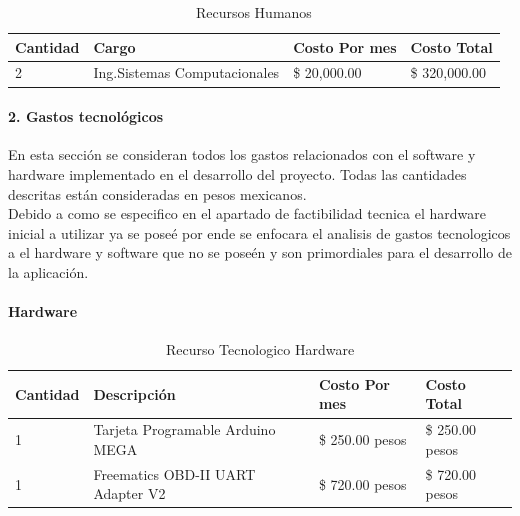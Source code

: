 \begin{table}[h!]
\begin{tabular}{|p{2cm}|p{4cm}|p{4cm}|p{4cm}|}
\hline
\textbf{Cantidad}& \textbf{Cargo}&\textbf{Costo Por mes}& \textbf{Costo Total}\\
\hline
\hline
2 & Ing.Sistemas Computacionales & \$ 20,000.00 & \$ 320,000.00 \\
\hline
\end{tabular}
\caption{Recursos Humanos}
\label{disenoEstructura:RH}
\end{table}


\paragraph{2. Gastos tecnológicos} 

En esta sección se consideran todos los gastos relacionados con el software y hardware implementado en el desarrollo del proyecto. Todas las cantidades descritas están consideradas en pesos mexicanos.\\

Debido a como se especifico en el apartado de factibilidad tecnica el hardware inicial a utilizar ya se poseé por ende se enfocara el analisis de gastos tecnologicos a el hardware y software que no se poseén y son primordiales para el desarrollo de la aplicación.

\paragraph{Hardware} 

\begin{table}[h!]
\begin{tabular}{|p{2cm}|p{4cm}|p{4cm}|p{4cm}|}
\hline
\textbf{Cantidad}& \textbf{Descripción}&\textbf{Costo Por mes}& \textbf{Costo Total}\\
\hline
\hline
1 & Tarjeta Programable Arduino MEGA & \$ 250.00 pesos & \$ 250.00 pesos\\
\hline
\hline
1 & Freematics OBD-II UART Adapter V2 & \$ 720.00 pesos & \$ 720.00 pesos\\
\hline
\end{tabular}
\caption{Recurso Tecnologico Hardware}
\label{disenoEstructura:RecTecHW}
\end{table}

